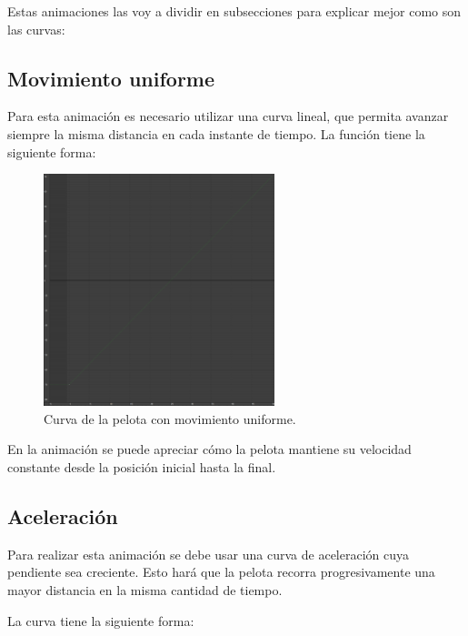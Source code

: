 \documentclass{article}
\begin{document}
Estas animaciones las voy a dividir en subsecciones para explicar mejor como son las curvas:

\newpage

\subsection{Movimiento uniforme}

Para esta animación es necesario utilizar una curva lineal, que permita avanzar siempre la misma distancia en cada instante de tiempo. La función tiene la siguiente forma:

\begin{figure}[H]
    \centering
    \includegraphics[width=0.6\textwidth]{imagenes/Ejercicio 1/curvas/uniforme.png}
    \caption{Curva de la pelota con movimiento uniforme.}
\end{figure}

En la animación se puede apreciar cómo la pelota mantiene su velocidad constante desde la posición inicial hasta la final.

\newpage

\subsection{Aceleración}

Para realizar esta animación se debe usar una curva de aceleración cuya pendiente sea creciente. Esto hará que la pelota recorra progresivamente una mayor distancia en la misma cantidad de tiempo.

\bigskip

La curva tiene la siguiente forma:
\end{document}
